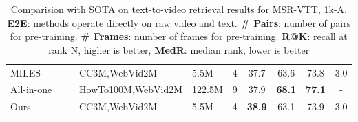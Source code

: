 \documentclass[10pt,twocolumn,letterpaper]{article}
\begin{document}
\begin{table*}[]
\begin{tabular}{ll|lll|cccc}
        MILES ~\cite{miles}       &  & CC3M,WebVid2M       & 5.5M  &  4   & 37.7 & 63.6                     & 73.8    & 3.0                 \\
        All-in-one ~\cite{all-in-one}  &  & HowTo100M,WebVid2M   & 122.5M  & 9 & 37.9 & \textbf{68.1}                     & \textbf{77.1}   & -                 \\
        \cellcolor{mygray-bg}Ours         & \cellcolor{mygray-bg} &\cellcolor{mygray-bg}CC3M,WebVid2M        &\cellcolor{mygray-bg}5.5M    &\cellcolor{mygray-bg}4   &\cellcolor{mygray-bg}\textbf{38.9} &\cellcolor{mygray-bg}63.1 &\cellcolor{mygray-bg}73.9 &\cellcolor{mygray-bg}3.0 \\ \bottomrule
        \end{tabular}\vspace{-2mm}
        
        \caption{Comparision with SOTA on text-to-video retrieval results for MSR-VTT, 1k-A. \textbf{E2E}: methods operate directly on raw video and text. \textbf{\# Pairs}: number of pairs for pre-training. \textbf{\# Frames}: number of frames for pre-training. \textbf{R@K}: recall at rank N, higher is better, \textbf{MedR}: median rank, lower is better}
        \label{tab:MSRVTT}
        \end{table*}
\end{document}
